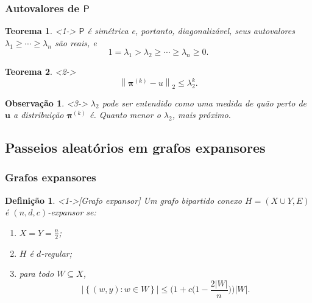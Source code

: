 \documentclass{beamer}
\def\MMp{\mathrm{.}} %
\def\geq{\geqslant} %
\def\leq{\leqslant} %
\def\chaves#1{\left\{ #1 \right\}} %
\def\cardi#1{\left| #1 \right|} %
\def\cjpp#1#2{\chaves{#1\colon#2}} %
\def\vetor#1{\boldsymbol{#1}}
\def\matriz#1{\mathsf{#1}}
\def\norma#1#2{{\left\|{#2}\right\|}_{#1}}
\theoremstyle{teoaxicorlem}
\newtheorem{Teo}{Teorema}
\theoremstyle{defnotnom}
\newtheorem{Def}{Definição}
\newtheorem{Obs}{Observação}
\begin{document}
\begin{frame}
  \frametitle{Autovalores de $\matriz P$}
  \begin{Teo}<1->
    $\matriz P$
    é simétrica e, portanto, diagonalizável, seus autovalores
    $\lambda_1\geq\dotsb\geq\lambda_n$ são reais, e
    \begin{equation*}
      1 = \lambda_1 > \lambda_2 \geq\dotsb\geq \lambda_n\geq 0\MMp
    \end{equation*}
  \end{Teo}
  \vfill
  \begin{Teo}<2->
    \begin{equation*}
      \norma2{{\vetor \pi}^{(k)}-u} \leq \lambda_2^k\MMp
    \end{equation*}
  \end{Teo}
  \vfill
  \begin{Obs}<3->
    $\lambda_2$ pode ser entendido como uma medida de quão perto de
    $\vetor u$ a distribuição ${\vetor{\pi}}^{(k)}$ é. Quanto menor o
    $\lambda_2$, mais próximo.
  \end{Obs}
\end{frame}

\subsection{Passeios aleatórios em grafos expansores}

\begin{frame}
  \frametitle{Grafos expansores}
  \begin{Def}<1->[Grafo expansor]
    Um grafo bipartido conexo
    $H=(X\cup Y, E)$ é \alert{$(n,d,c)$-\alert{expansor}} se:
    \begin{enumerate}
    \item $X=Y=\frac{n}2$;
    \item $H$ é $d$-regular;
    \item para todo $W\subseteq X$,
      \begin{equation*}
        \cardi{\cjpp{(w,y)}{w\in W}} \leq
        \Biggl( 1 + c\biggl(
          1 - \frac{2|W|}{n}
        \biggr)\Biggr)
        |W|\MMp
      \end{equation*}
    \end{enumerate}
  \end{Def}
\end{frame}
\end{document}
